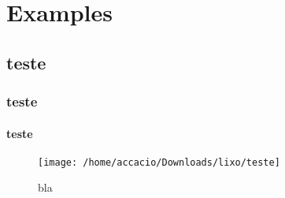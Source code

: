 
\chapter{Examples}
\label{chap:examples}

\section{teste}
\subsection{teste}
\subsubsection{teste}





\begin{figure}[H]
  \centering
  \texttt{[image: /home/accacio/Downloads/lixo/teste]}
  \caption{bla}
\end{figure}




